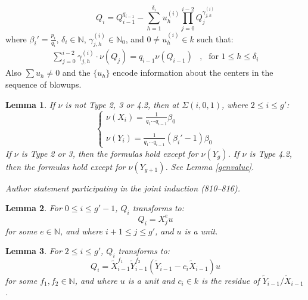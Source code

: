 \documentclass[10pt,a4paper]{amsart}
\newtheorem{lem}{Lemma}
\begin{document}
\begin{equation}  \label{genrecur}
Q_i=Q_{i-1}^{q_{i-1}}-\sum_{h=1}^{\delta_i} u_h^{(i)} \prod_{j=0}^{i-2} Q_j^{\gamma_{j,h}^{(i)}}
\end{equation}
where $\displaystyle \beta_i'=\frac{p_i}{q_i}$, $\delta_i\in\mathbb{N}$, $\gamma_{j,h}^{(i)}\in\mathbb N_0$, and $0\neq u_h^{(i)}\in k$ such that:
\begin{equation*}
\begin{array}{lll}
\displaystyle \sum_{j=0}^{i-2} \gamma_{j,h}^{(i)}\cdot\nu(Q_j) = q_{i-1}\nu(Q_{i-1}) & , & \text{for } 1\leq h \leq \delta_i
\end{array}
\end{equation*}
Also $\sum u_h\neq 0$ and the $\{u_h\}$ encode information about the centers in the sequence of blowups.

\begin{lem} \label{beta'-1} If $\nu$ is not Type 2, 3 or 4.2, then at $\Sigma(i,0,1)$, where $2\leq i \leq g'$:
\begin{equation*}
\left\{
\begin{array}{l}
\displaystyle \nu(X_i)=\frac{1}{q_1\cdots q_{i-1}}\beta_0
\\\\
\displaystyle \nu(Y_i)=\frac{1}{q_1\cdots q_{i-1}}\left(\beta_i'-1\right)\beta_0
\end{array}
\right.
\end{equation*}
If $\nu$ is Type 2 or 3, then the formulas hold except for $\nu(Y_g)$. If $\nu$ is Type 4.2, then the formulas hold except for $\nu(Y_{g+1})$. See Lemma \ref{genvalue}.
\end{lem}

\par\medskip\noindent\textit{Author statement participating in the joint induction (810--816).}\par\smallskip
\begin{lem} \label{leveli+}
For $0\leq i\leq g'-1$, $Q_i$ transforms to:
\begin{equation*}
Q_i=X_{j}^eu
\end{equation*}
for some $e\in\mathbb{N}$, and where $i+1\leq j\leq g'$, and $u$ is a unit.
\end{lem}



\begin{lem} \label{strict}
For $2\leq i\leq g'$, $Q_i$ transforms to:
\begin{equation*}
Q_i=\tilde X_{i-1}^{f_1}\tilde Y_{i-1}^{f_2}\left(\tilde Y_{i-1}-c_i\tilde X_{i-1}\right)u
\end{equation*}
for some $f_1,f_2\in\mathbb{N}$, and where $u$ is a unit and $c_i\in k$ is the residue of $\tilde Y_{i-1}/\tilde X_{i-1}$.
\end{lem}
\end{document}
